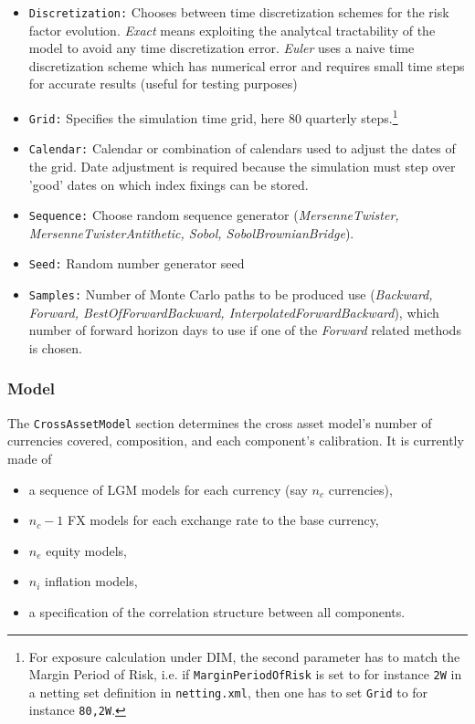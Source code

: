 \documentclass[12pt, a4paper]{article}
\begin{document}
\begin{itemize}
\item {\tt Discretization:} Chooses between time discretization schemes for the risk factor evolution. {\em Exact} means
exploiting the analytcal tractability of the model to avoid any time discretization error. {\em Euler} uses a naive time
discretization scheme which has numerical error and requires small time steps for accurate results (useful for testing
purposes)
\item {\tt Grid:} Specifies the simulation time grid, here 80 quarterly steps.\footnote{For exposure calculation under DIM, the second parameter has to match the Margin Period of Risk, i.e. if {\tt MarginPeriodOfRisk} is set to for instance {\tt 2W} in a netting set definition in {\tt netting.xml}, then one has to set {\tt Grid} to for instance {\tt 80,2W}.}
\item {\tt Calendar:} Calendar or combination of calendars used to adjust the dates of the grid. Date adjustment is
required because the simulation must step over 'good' dates on which index fixings can be stored.
\item {\tt Sequence:} Choose random sequence generator ({\em MersenneTwister, MersenneTwisterAntithetic, Sobol,
SobolBrownianBridge}).
\item {\tt Seed:} Random number generator seed
\item {\tt Samples:} Number of Monte Carlo paths to be produced
use ({\em Backward, Forward, BestOfForwardBackward, InterpolatedForwardBackward}), which number of forward horizon days
to use if one of the {\em Forward } related methods is chosen.
\end{itemize}

\subsubsection{Model}\label{sec:sim_model}

The {\tt CrossAssetModel} section determines the cross asset model's number of currencies covered, composition, and each
component's calibration. It is currently made of 
\begin{itemize}
\item a sequence of LGM models for each currency (say $n_c$ currencies), 
\item $n_c-1$ FX models for each exchange rate to the base currency, 
\item $n_e$ equity models,
\item $n_i$ inflation models, 
\item a specification of the correlation structure between all components.
\end{itemize}
\end{document}
